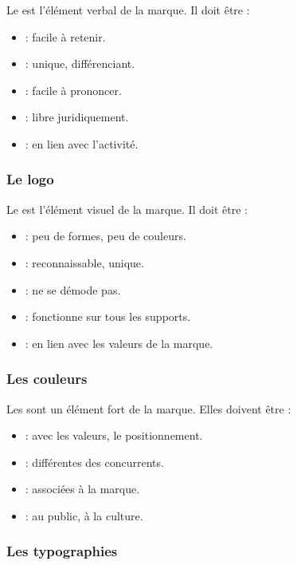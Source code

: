 Le  est l'élément verbal de la marque. Il doit être :

\begin{itemize}
    \item {} : facile à retenir.
    \item {} : unique, différenciant.
    \item {} : facile à prononcer.
    \item {} : libre juridiquement.
    \item {} : en lien avec l'activité.
\end{itemize}

\subsubsection{Le logo}

Le  est l'élément visuel de la marque. Il doit être :

\begin{itemize}
    \item {} : peu de formes, peu de couleurs.
    \item {} : reconnaissable, unique.
    \item {} : ne se démode pas.
    \item {} : fonctionne sur tous les supports.
    \item {} : en lien avec les valeurs de la marque.
\end{itemize}

\subsubsection{Les couleurs}

Les  sont un élément fort de la marque. Elles doivent être :

\begin{itemize}
    \item {} : avec les valeurs, le positionnement.
    \item {} : différentes des concurrents.
    \item {} : associées à la marque.
    \item {} : au public, à la culture.
\end{itemize}

\subsubsection{Les typographies}

